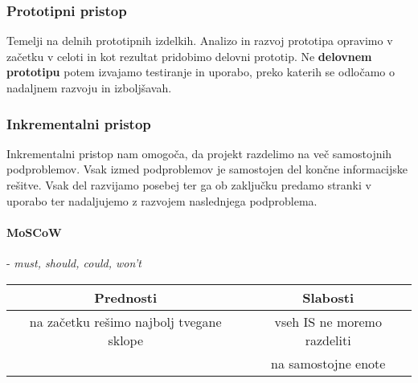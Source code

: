 \documentclass[a4paper,12pt]{report}
\begin{document}
   \subsubsection{Prototipni pristop}
   Temelji na delnih prototipnih izdelkih. Analizo in razvoj prototipa opravimo v začetku v celoti in kot rezultat pridobimo delovni prototip.
   Ne \textbf{delovnem prototipu} potem izvajamo testiranje in uporabo, preko katerih se odločamo o nadaljnem razvoju in izboljšavah.

   \subsubsection{Inkrementalni pristop}
   Inkrementalni pristop nam omogoča, da projekt razdelimo na več samostojnih podproblemov. Vsak izmed podproblemov je samostojen del končne informacijske rešitve.
   Vsak del razvijamo posebej ter ga ob zaključku predamo stranki v uporabo ter nadaljujemo z razvojem naslednjega podproblema.

   \paragraph{MoSCoW} - \textit{must, should, could, won't}

   \begin{center}
      \begin{tabular}{|c||c|}
         \hline
         \textbf{Prednosti} & \textbf{Slabosti}\\
         \hline
         na začetku rešimo najbolj tvegane sklope & vseh IS ne moremo razdeliti\\& na samostojne enote\\
         \hline
      \end{tabular}
   \end{center}

   
   
   
\end{document}
